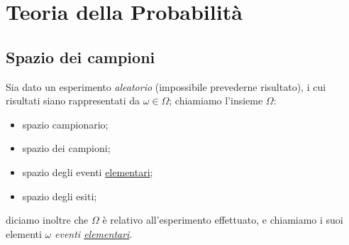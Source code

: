 
\chapter{Teoria della Probabilità}
    \section{Spazio dei campioni}
        \begin{defn}
            Sia dato un esperimento \textit{aleatorio} (impossibile prevederne risultato), i cui risultati siano rappresentati da $\omega \in \Omega$; chiamiamo l'insieme $\Omega$:
            \begin{itemize}
                \item spazio campionario;
                \item spazio dei campioni;
                \item spazio degli eventi \underline{elementari};
                \item spazio degli esiti;
            \end{itemize}
            diciamo inoltre che $\Omega$ è relativo all'esperimento effettuato, e chiamiamo i suoi elementi $\omega$ \textit{eventi \underline{elementari}}.
        \end{defn}

